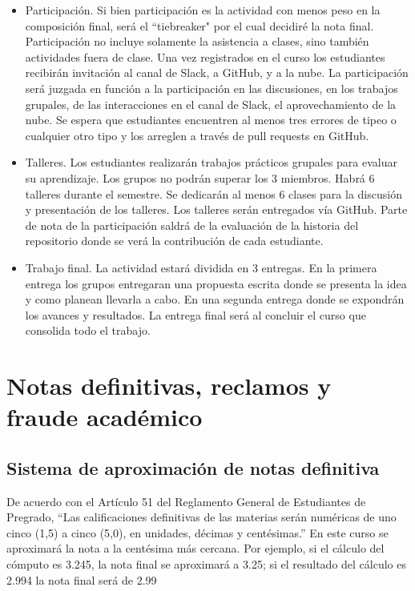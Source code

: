 \documentclass[11pt]{article}
\begin{document}
\begin{itemize}


\item Participación. Si bien participación es la actividad con menos peso en la composición final, será el “tiebreaker" por el cual decidiré la nota final. Participación no incluye solamente la asistencia a clases, sino también actividades fuera de clase. Una vez registrados en el curso los estudiantes recibirán invitación al canal de Slack,  a GitHub, y a la nube. La participación será juzgada en función a la participación en las discusiones, en los trabajos grupales, de las interacciones en el canal de Slack, el aprovechamiento de la nube. Se espera que estudiantes encuentren al menos tres errores de tipeo o cualquier otro tipo y los arreglen a través de pull requests en GitHub.

\item Talleres. Los estudiantes realizarán trabajos prácticos grupales para evaluar su aprendizaje. Los grupos no podrán superar los 3 miembros. Habrá 6 talleres durante el semestre. Se dedicarán al menos 6 clases para la discusión y presentación de los talleres. Los talleres serán entregados vía GitHub. Parte de nota de la participación saldrá de la evaluación de la historia del repositorio donde se verá la contribución de cada estudiante.

\item Trabajo final.  La actividad estará dividida en 3 entregas. En la primera entrega los grupos entregaran una propuesta escrita donde se presenta la idea y como planean llevarla a cabo. En una segunda entrega donde se expondrán los avances y resultados. La entrega final será al concluir el curso que consolida todo el trabajo. 
\end{itemize}




\section{Notas definitivas, reclamos y fraude académico}
\subsection*{Sistema de aproximación de notas definitiva}
De acuerdo con el Artículo 51 del Reglamento General de Estudiantes de Pregrado, “Las calificaciones definitivas de las materias serán numéricas de uno cinco (1,5) a cinco (5,0), en unidades, décimas y centésimas.”
En este curso se aproximará la nota a la centésima más cercana. Por ejemplo, si el cálculo del cómputo es 3.245, la nota final se aproximará a 3.25; si el resultado del cálculo es 2.994 la nota final será de 2.99
\end{document}
